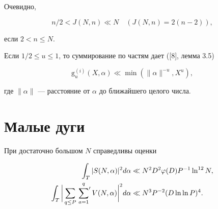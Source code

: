 Очевидно,


\begin{equation}


n/2<J(N,n)\ll N\quad \left(J(N,n)=2(n-2)\right),


\end{equation}


если $2<n\le N$.


Если $1/2\le u\le 1$, то суммирование по частям дает ([8], лемма 3.5)


\begin{equation}


\mathrm g_u^{(i)}(X,\alpha)\ll\min(\|\alpha\|^{-u},X^u),


\end{equation}


где $\|\alpha\|$ --- расстояние от $\alpha$ до ближайшего целого числа.





\section{Малые дуги}





\begin{lems}


При достаточно большом $N$ справедливы оценки


\begin{align}


\int_T |S(N,\alpha)|^2 d\alpha&\ll N^2D^2\varphi(D)P^{-1}\ln^{12}N,\\


%


\int_T\bigg|\sum_{q\le P}\sideset{}{'}\sum_{a=1}^q


V(N,\alpha)\bigg|^2 d\alpha&\ll N^3P^{-2}(D\ln\ln P)^4.


\end{align}


\end{lems}





